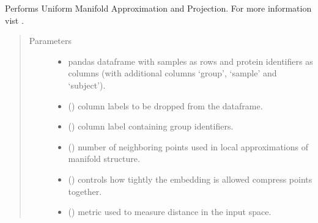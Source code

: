 \documentclass[letterpaper,10pt,english]{sphinxmanual}
\begin{document}
\begin{fulllineitems}
\label{\detokenize{_autosummary/analytics_core.analytics:analytics_core.analytics.analytics.run_umap}}
Performs Uniform Manifold Approximation and Projection. For more information vist .
\begin{quote}\begin{description}
\item[{Parameters}] \leavevmode\begin{itemize}
\item {} 
 \textendash{} pandas dataframe with samples as rows and protein identifiers as columns (with additional columns ‘group’, ‘sample’ and ‘subject’).

\item {} 
 () \textendash{} column labels to be dropped from the dataframe.

\item {} 
 () \textendash{} column label containing group identifiers.

\item {} 
 () \textendash{} number of neighboring points used in local approximations of manifold structure.

\item {} 
 () \textendash{} controls how tightly the embedding is allowed compress points together.

\item {} 
 () \textendash{} metric used to measure distance in the input space.


\end{itemize}
\end{description}
\end{quote}
\end{fulllineitems}
\end{document}
